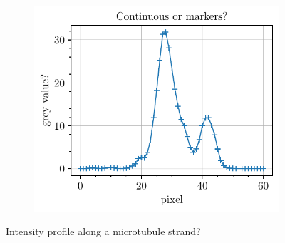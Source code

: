 \begin{figure}[htbp]
\begin{subfigure}{0.5\textwidth}
        \includegraphics[scale=1]{figures/microtubules_width.pdf}
    \end{subfigure}
    \label{fig:microtubules_width}
    \caption{Intensity profile along a microtubule strand?}
\end{figure}
